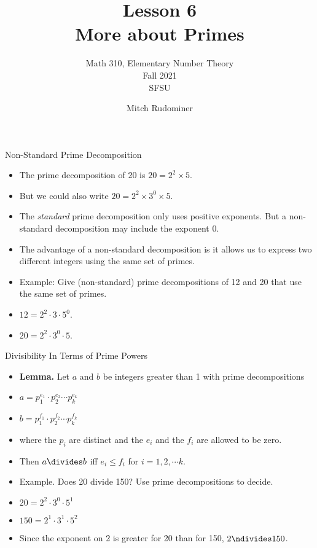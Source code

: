 \documentclass{beamer}
\title{Lesson 6 \\ More about Primes}
\subtitle{Math 310, Elementary Number Theory \\ Fall 2021 \\ SFSU}
\author{Mitch Rudominer}
\date{}
\begin{document}
\begin{frame}
  \titlepage
\end{frame}


\begin{frame}{Non-Standard Prime Decomposition}

\begin{itemize}
  \item The prime decomposition of 20 is $20 = 2^2 \times 5$.
  \item But we could also write $20 = 2^2 \times 3^0 \times 5$.
  \item The \emph{standard} prime decomposition only uses positive exponents.
  But a non-standard decomposition may include the exponent 0.
  \item The advantage of a non-standard decomposition is it allows us to express
  two different integers using the same set of primes.
  \item Example: Give (non-standard) prime decompositions of 12 and 20 that use the same set of primes.
  \item $12 = 2^2 \cdot 3 \cdot 5^0$.
  \item $20 = 2^2 \cdot 3^0 \cdot 5$.
\end{itemize}

\end{frame}

\begin{frame}{Divisibility In Terms of Prime Powers}

\begin{itemize}
  \item \textbf{Lemma.} Let $a$ and $b$ be integers greater than 1 with prime decompositions
  \item $a=p_1^{e_1} \cdot p_2^{e_2} \cdots p_k^{e_k}$
  \item $b=p_1^{f_1} \cdot p_2^{f_2} \cdots p_k^{f_k}$
  \item where the $p_i$ are distinct and the $e_i$ and the $f_i$ are allowed to be zero.
  \item Then $a\divides b$ iff $e_i \leq f_i$ for $i=1,2,\cdots k$.
  \item Example. Does 20 divide 150? Use prime decompositions to decide.
  \item $20 = 2^2 \cdot 3^0 \cdot 5^1$
  \item $150 = 2^1 \cdot 3^1 \cdot 5^2$
  \item Since the exponent on 2 is greater for 20 than for 150, $2\ndivides 150$.
\end{itemize}

\end{frame}
\end{document}

